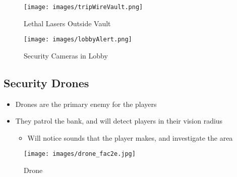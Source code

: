 \documentclass[10pt]{report}
\begin{document}
\begin{figure}[H]
    \centering
	\texttt{[image: images/tripWireVault.png]}
    \caption{Lethal Lasers Outside Vault}
\end{figure}

\begin{figure}[H]
    \centering
	\texttt{[image: images/lobbyAlert.png]}
    \caption{Security Cameras in Lobby}
\end{figure}

\subsection{Security Drones}

\begin{minipage}{.8\linewidth}
    \begin{itemize}
        \item Drones are the primary enemy for the players
        \item They patrol the bank, and will detect players in their vision radius
        \begin{itemize}
            \item Will notice sounds that the player makes, and investigate the area 
        \end{itemize}
    \end{itemize}
\end{minipage} \hfill
\begin{minipage}{.18\linewidth}
    \begin{figure}[H]
        \centering
        \texttt{[image: images/drone\_fac2e.jpg]}
        \caption{Drone}
    \end{figure}
\end{minipage}
\end{document}
